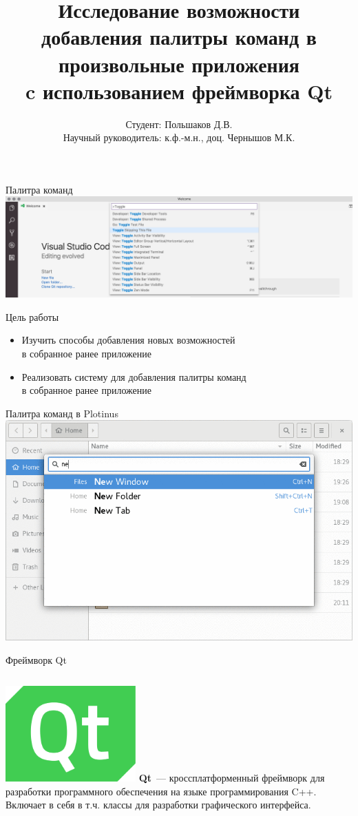 \documentclass[aspectratio=1610]{beamer}
\title[Thesis]{Исследование возможности добавления палитры команд
в произвольные приложения\\c использованием фреймворка Qt}
\author{Студент: Польшаков Д.В. \\
Научный руководитель: к.ф.-м.н., доц. Чернышов М.К.}
\institute{ВГУ}
\date{\the\year}
\begin{document}
\begin{frame}[plain]
	\titlepage
\end{frame}

\begin{frame}{Палитра команд}
	\includegraphics[width=\textwidth]{vscode}
\end{frame}

\begin{frame}{Цель работы}
	\begin{itemize}
		\item Изучить способы добавления новых возможностей\\
		в собранное ранее приложение
		\item Реализовать систему для добавления палитры команд\\
		в собранное ранее приложение
	\end{itemize}
\end{frame}

\begin{frame}{Палитра команд в Plotinus}
	\centering
	\includegraphics[height=0.9\textheight]{Plotinus}
\end{frame}

\begin{frame}{Фреймворк Qt}
    \begin{columns}
		\centering
		\includegraphics[width=5cm]{Qt}
		\textbf{Qt}~— кроссплатформенный фреймворк для разработки программного обеспечения на языке программирования C++. Включает в себя в т.ч. классы для разработки
		графического интерфейса.
	\end{columns}
\end{frame}
\end{document}
